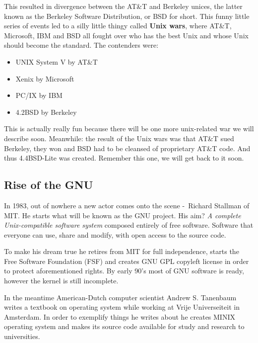 \documentclass[../ops.tex]{subfiles}
\begin{document}
        This resulted in divergence between the AT\&T and Berkeley unices, the
        latter known as the Berkeley Software Distribution, or BSD for short.
        This funny little series of events led to a silly little thingy called
        {\bf Unix wars}, where AT\&T, Microsoft, IBM and BSD all fought over who
        has the best Unix and whose Unix should become the standard. The
        contenders were:
        \begin{itemize}
                \item UNIX System V by AT\&T
                \item Xenix by Microsoft
                \item PC/IX by IBM
                \item 4.2BSD by Berkeley
        \end{itemize}

        This is actually really fun because there will be one more unix-related
        war we will describe soon.
        Meanwhile: the result of the Unix wars was that AT\&T sued Berkeley,
        they won and BSD had to be cleansed of proprietary AT\&T code. And thus
        4.4BSD-Lite was created. Remember this one, we will get back to it soon.

        \subsection{Rise of the GNU}
        In 1983, out of nowhere a new actor comes onto the scene -~Richard
        Stallman of MIT. He starts what will be known as the GNU project. His
        aim? \emph{A complete Unix-compatible software system} composed entirely
        of free software. Software that everyone can use, share and modify, with
        open access to the source code.

        To make his dream true he retires from MIT for full independence, starts
        the Free Software Foundation (FSF) and creates GNU GPL copyleft license
        in order to protect aforementioned rights. By early 90's most of GNU
        software is ready, however the kernel is still incomplete.

        In the meantime American-Dutch computer scientist Andrew S. Tanenbaum
        writes a textbook on operating system while working at Vrije
        Universeiteit in Amsterdam. In order to exemplify things he writes about
        he creates MINIX operating system and makes its source code available
        for study and research to universities.
\end{document}
